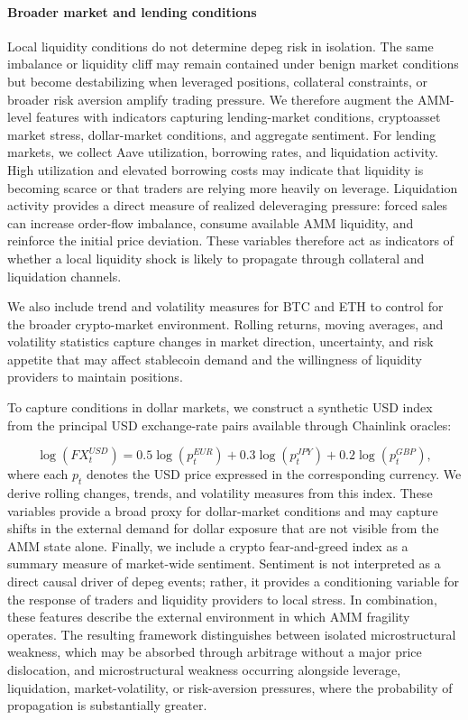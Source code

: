 \documentclass[a4paper,fleqn]{cas-sc}
\begin{document}
\paragraph{Broader market and lending conditions}
Local liquidity conditions do not determine depeg risk in isolation. The same imbalance or liquidity cliff may remain contained under benign market conditions but become destabilizing when leveraged positions, collateral constraints, or broader risk aversion amplify trading pressure. We therefore augment the AMM-level features with indicators capturing lending-market conditions, cryptoasset market stress, dollar-market conditions, and aggregate sentiment.
For lending markets, we collect Aave utilization, borrowing rates, and liquidation activity. High utilization and elevated borrowing costs may indicate that liquidity is becoming scarce or that traders are relying more heavily on leverage. Liquidation activity provides a direct measure of realized deleveraging pressure: forced sales can increase order-flow imbalance, consume available AMM liquidity, and reinforce the initial price deviation. These variables therefore act as indicators of whether a local liquidity shock is likely to propagate through collateral and liquidation channels.

We also include trend and volatility measures for BTC and ETH to control for the broader crypto-market environment. Rolling returns, moving averages, and volatility statistics capture changes in market direction, uncertainty, and risk appetite that may affect stablecoin demand and the willingness of liquidity providers to maintain positions. 

To capture conditions in dollar markets, we construct a synthetic USD index from the principal USD exchange-rate pairs available through Chainlink oracles:

\begin{equation}
\log(FX^{USD}_t)
=
0.5\log(p^{EUR}_t)
+
0.3\log(p^{JPY}_t)
+
0.2\log(p^{GBP}_t),
\end{equation}
where each \(p_t\) denotes the USD price expressed in the corresponding currency. We derive rolling changes, trends, and volatility measures from this index. These variables provide a broad proxy for dollar-market conditions and may capture shifts in the external demand for dollar exposure that are not visible from the AMM state alone.
Finally, we include a crypto fear-and-greed index as a summary measure of market-wide sentiment. Sentiment is not interpreted as a direct causal driver of depeg events; rather, it provides a conditioning variable for the response of traders and liquidity providers to local stress. In combination, these features describe the external environment in which AMM fragility operates. The resulting framework distinguishes between isolated microstructural weakness, which may be absorbed through arbitrage without a major price dislocation, and microstructural weakness occurring alongside leverage, liquidation, market-volatility, or risk-aversion pressures, where the probability of propagation is substantially greater.
\end{document}
